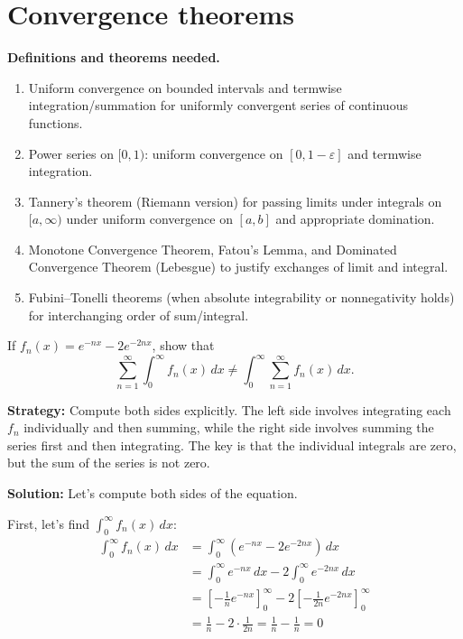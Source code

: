 \section{Convergence theorems}

\noindent\textbf{Definitions and theorems needed.}
\begin{enumerate}[label=(\alph*)]
\item Uniform convergence on bounded intervals and termwise integration/summation for uniformly convergent series of continuous functions.
\item Power series on $[0,1)$: uniform convergence on $[0,1-\varepsilon]$ and termwise integration.
\item Tannery's theorem (Riemann version) for passing limits under integrals on $[a,\infty)$ under uniform convergence on $[a,b]$ and appropriate domination.
\item Monotone Convergence Theorem, Fatou's Lemma, and Dominated Convergence Theorem (Lebesgue) to justify exchanges of limit and integral.
\item Fubini–Tonelli theorems (when absolute integrability or nonnegativity holds) for interchanging order of sum/integral.
\end{enumerate}



\begin{problembox}
If $f_n(x) = e^{-nx} - 2e^{-2nx}$, show that 
\[\sum_{n=1}^{\infty} \int_{0}^{\infty} f_n(x) \, dx \neq \int_{0}^{\infty} \sum_{n=1}^{\infty} f_n(x) \, dx.\]
\end{problembox}

\noindent\textbf{Strategy:} Compute both sides explicitly. The left side involves integrating each $f_n$ individually and then summing, while the right side involves summing the series first and then integrating. The key is that the individual integrals are zero, but the sum of the series is not zero.

\bigskip\noindent\textbf{Solution:}
Let's compute both sides of the equation.

First, let's find $\int_{0}^{\infty} f_n(x) \, dx$:
\begin{align*}
\int_{0}^{\infty} f_n(x) \, dx &= \int_{0}^{\infty} (e^{-nx} - 2e^{-2nx}) \, dx \\
&= \int_{0}^{\infty} e^{-nx} \, dx - 2\int_{0}^{\infty} e^{-2nx} \, dx \\
&= \left[-\frac{1}{n}e^{-nx}\right]_{0}^{\infty} - 2\left[-\frac{1}{2n}e^{-2nx}\right]_{0}^{\infty} \\
&= \frac{1}{n} - 2 \cdot \frac{1}{2n} = \frac{1}{n} - \frac{1}{n} = 0
\end{align*}

